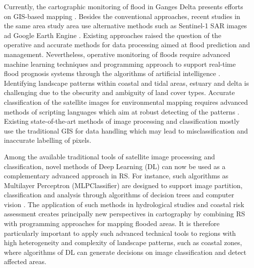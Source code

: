 \documentclass[water,article,submit,pdftex,moreauthors]{Definitions/mdpi}
\begin{document}
Currently, the cartographic monitoring of flood in Ganges Delta presents efforts on GIS-based mapping \cite{Sanyal2023,ISLAM2023167,RANA2023}. Besides the conventional approaches, recent studies in the same area study area use alternative methods such as Sentinel-1 SAR images ad Google Earth Engine \cite{ChakmaAkter,SINGHA2020278}. Existing approaches raised the question of the operative and accurate methods for data processing aimed at flood prediction and management. Nevertheless, operative monitoring of floods require advanced machine learning techniques and programming approach to support real-time flood prognosis systems through the algorithms of artificial intelligence \cite{ZHAO2021126777}. Identifying landscape patterns within coastal and tidal areas, estuary and delta is challenging due to the obscurity and ambiguity of land cover types. Accurate classification of the satellite images for environmental mapping requires advanced methods of scripting languages which aim at robust detecting of the patterns \cite{YANG2020100413,Lemenkova202322,BEVERIDGE2020104843,SADIQ2023111233,Lemenkova202227}. Existing state-of-the-art methods of image processing and classification mostly use the traditional GIS for data handling which may lead to misclassification and inaccurate labelling of pixels. 

Among the available traditional tools of satellite image processing and classification, novel methods of Deep Learning (DL) can now be used as a complementary advanced approach in RS. For instance, such algorithms as Multilayer Perceptron (MLPClassifier) are designed to support image partition, classification and analysis through algorithms of decision trees and computer vision \cite{6493388,6422192,7507955}. The application of such methods in hydrological studies and coastal risk assessment creates principally new perspectives in cartography by combining RS with programming approaches for mapping flooded areas. It is therefore particularly important to apply such advanced technical tools to regions with high heterogeneity and complexity of landscape patterns, such as coastal zones, where algorithms of DL can generate decisions on image classification and detect affected areas. 
\end{document}
